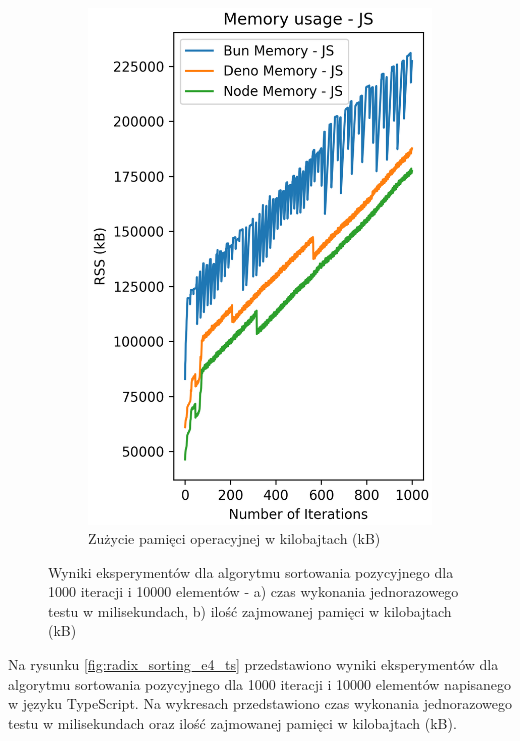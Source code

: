 \begin{figure}[H]
\begin{subfigure}[b]{0.42\textwidth}
    \includegraphics[width=\textwidth]{Figures/sorting/sorting_radix_1000_10000_js_memory.png}
    \caption{Zużycie pamięci operacyjnej w kilobajtach (kB)}
    \label{fig:radix_sorting_e4_memory}
  \end{subfigure}
  \hfill
  \caption{Wyniki eksperymentów dla algorytmu sortowania pozycyjnego dla 1000 iteracji i 10000 elementów - a) czas wykonania jednorazowego testu w milisekundach, b) ilość zajmowanej pamięci w kilobajtach (kB)}
  \label{fig:radix_sorting_e4}
\end{figure}

Na rysunku \ref{fig:radix_sorting_e4_ts} przedstawiono wyniki eksperymentów dla algorytmu sortowania pozycyjnego dla 1000 iteracji i 10000 elementów napisanego w języku TypeScript. Na wykresach przedstawiono czas wykonania jednorazowego testu w milisekundach oraz ilość zajmowanej pamięci w kilobajtach (kB).

